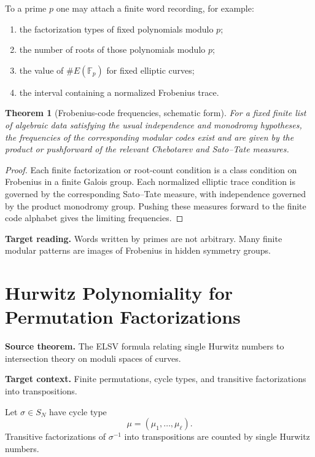 \documentclass[11pt]{article}
\newtheorem{theorem}{Theorem}[section]
\begin{document}
To a prime \(p\) one may attach a finite word recording, for example:
\begin{enumerate}[label=\textup{(\roman*)}]
\item the factorization types of fixed polynomials modulo \(p\);
\item the number of roots of those polynomials modulo \(p\);
\item the value of \(\#E(\mathbb F_p)\) for fixed elliptic curves;
\item the interval containing a normalized Frobenius trace.
\end{enumerate}

\begin{theorem}[Frobenius-code frequencies, schematic form]
For a fixed finite list of algebraic data satisfying the usual independence and monodromy hypotheses, the frequencies of the corresponding modular codes exist and are given by the product or pushforward of the relevant Chebotarev and Sato--Tate measures.
\end{theorem}

\begin{proof}
Each finite factorization or root-count condition is a class condition on Frobenius in a finite Galois group. Each normalized elliptic trace condition is governed by the corresponding Sato--Tate measure, with independence governed by the product monodromy group. Pushing these measures forward to the finite code alphabet gives the limiting frequencies.
\end{proof}

\textbf{Target reading.}
Words written by primes are not arbitrary. Many finite modular patterns are images of Frobenius in hidden symmetry groups.

\section{Hurwitz Polynomiality for Permutation Factorizations}

\textbf{Source theorem.}
The ELSV formula relating single Hurwitz numbers to intersection theory on moduli spaces of curves.

\textbf{Target context.}
Finite permutations, cycle types, and transitive factorizations into transpositions.

Let \(\sigma\in S_N\) have cycle type
\[
\mu=(\mu_1,\ldots,\mu_\ell).
\]
Transitive factorizations of \(\sigma^{-1}\) into transpositions are counted by single Hurwitz numbers.
\end{document}
